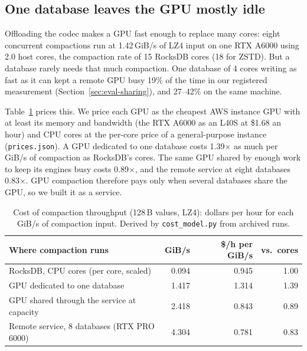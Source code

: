 \documentclass[sigconf, nonacm]{acmart}
\begin{document}
\subsection{One database leaves the GPU mostly idle}
\label{sec:motivation-idle}

Offloading the codec makes a GPU fast enough to replace many cores: eight concurrent
compactions run at 1.42\,GiB/s of LZ4 input on one RTX A6000 using 2.0 host cores, the
compaction rate of 15 RocksDB cores (18 for ZSTD). But a database rarely needs that much
compaction. One database of 4 cores writing as fast as it can kept a remote GPU busy 19\% of
the time in our registered measurement (Section~\ref{sec:eval-sharing}), and 27--42\% on the
same machine. %

Table~\ref{tab:cost-throughput} prices this. We price each GPU as the cheapest AWS instance GPU
with at least its memory and bandwidth (the RTX A6000 as an L40S at \$1.68 an hour) and CPU
cores at the per-core price of a general-purpose instance (\texttt{prices.json}). A GPU
dedicated to one database costs 1.39$\times$ as much per GiB/s of compaction as RocksDB's cores.
The same GPU shared by enough work to keep its engines busy costs 0.89$\times$, and the remote
service at eight databases 0.83$\times$. GPU compaction therefore pays only when several
databases share the GPU, so we built it as a service.

\begin{table}[t]
  \caption{Cost of compaction throughput (128\,B values, LZ4): dollars per hour for each GiB/s
  of compaction input. Derived by \texttt{cost\_model.py} from archived runs.}
  \label{tab:cost-throughput}
  \small
  \begin{tabular}{p{}rrr}
    \toprule
    Where compaction runs & GiB/s & \$/h per GiB/s & vs.\ cores \\
    \midrule
    RocksDB, CPU cores (per core, scaled) & 0.094 & 0.945 & 1.00 \\
    GPU dedicated to one database & 1.417 & 1.314 & 1.39 \\
    GPU shared through the service at capacity & 2.418 & 0.843 & 0.89 \\
    Remote service, 8 databases (RTX PRO 6000) & 4.304 & 0.781 & 0.83 \\
    \bottomrule
  \end{tabular}
\end{table}

\end{document}

